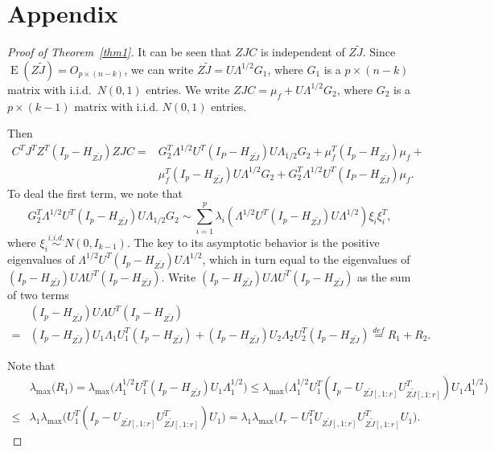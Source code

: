 \documentclass[review]{elsarticle}
\DeclareMathOperator{\myE}{E}
\theoremstyle{plain}
\theoremstyle{definition}
\theoremstyle{remark}
\begin{document}
\section{Appendix}

\begin{proof}[\textrm{Proof of Theorem~\ref{thm1}}]
It can be seen that $ZJC$ is independent of ${Z\tilde{J}}$.
Since
$
\myE (Z\tilde{J}) = O_{p\times (n-k)}
$,
we can write
$
Z\tilde{J} = U\Lambda^{1/2} G_1
$,
where $G_1$ is a $p\times (n-k)$ matrix with i.i.d.\ $N(0,1)$ entries.
We write
$
ZJC = \mu_f + U\Lambda^{1/2} G_2
$, 
where $G_2$ is a $p\times (k-1)$ matrix with i.i.d. $N(0,1)$ entries.

Then 
\begin{equation}\label{eq:maindec}
\begin{aligned}
C^TJ^T Z^T(I_p-H_{Z\tilde J}) ZJC
    =&
    G_2^T \Lambda^{1/2}U^T (I_P-H_{Z\tilde{J}})U\Lambda_{1/2}G_2+
\mu_f^T (I_p -H_{Z\tilde{J}})\mu_f+\\
    &\mu_f^T (I_p -H_{Z\tilde{J}})U\Lambda^{1/2}G_2+
G_2^T \Lambda^{1/2}U^T (I_P-H_{Z\tilde{J}})\mu_f.
\end{aligned}
\end{equation}
To deal the first term, we note that
$$
    G_2^T \Lambda^{1/2}U^T (I_p-H_{Z\tilde{J}})U\Lambda_{1/2}G_2\sim
    \sum_{i=1}^p \lambda_i (\Lambda^{1/2}U^T (I_p-H_{Z\tilde{J}})U\Lambda^{1/2})\xi_i \xi_i^T,
$$
where $\xi_i\overset{i.i.d.}{\sim} N(0,I_{k-1})$. The key to its asymptotic behavior is the positive eigenvalues of $\Lambda^{1/2}U^T (I_p-H_{Z\tilde{J}})U\Lambda^{1/2}$, which in turn equal to the eigenvalues of $(I_p-H_{Z\tilde{J}})U\Lambda U^T (I_p-H_{Z\tilde{J}})$.
Write $(I_p-H_{Z\tilde{J}})U\Lambda U^T (I_p-H_{Z\tilde{J}})$ as the sum of two terms
$$
\begin{aligned}
    &(I_p-H_{Z\tilde{J}})U\Lambda U^T (I_p-H_{Z\tilde{J}})
    \\
    =&
    (I_p-H_{Z\tilde{J}})U_1\Lambda_1 U_1^T(I_p-H_{Z\tilde{J}})+(I_p-H_{Z\tilde{J}})U_2\Lambda_2 U_2^T (I_p-H_{Z\tilde{J}})
    \overset{def}{=}R_1+R_2.
\end{aligned}
$$

Note that
$$
\begin{aligned}
    &\lambda_{\max}\big( R_1 \big)
    =
    \lambda_{\max}\big(\Lambda_1^{1/2} U_1^T(I_p-H_{Z\tilde{J}}) U_1 \Lambda_1^{1/2}\big)
    \leq 
    \lambda_{\max}\big(\Lambda_1^{1/2} U_1^T(I_p-U_{Z\tilde{J}[,1:r]}U_{Z\tilde{J}[,1:r]}^T) U_1 \Lambda_1^{1/2}\big)\\
    \leq &
    \lambda_1
    \lambda_{\max}\big(U_1^T(I_p-U_{Z\tilde{J}[,1:r]}U_{Z\tilde{J}[,1:r]}^T) U_1 \big)
    = 
    \lambda_1
    \lambda_{\max}\big(I_r - U_1^TU_{Z\tilde{J}[,1:r]}U_{Z\tilde{J}[,1:r]}^T U_1 \big).
\end{aligned}
$$


\end{proof}
\end{document}
